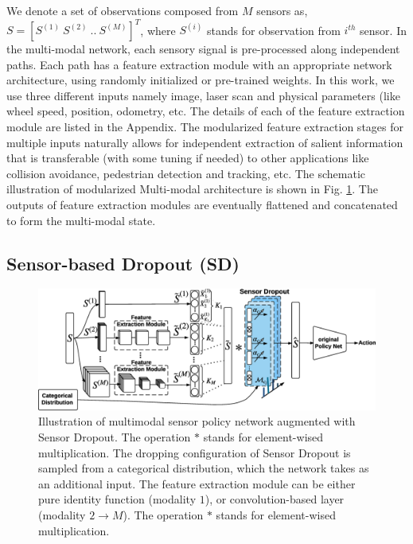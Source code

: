 \documentclass[../thesis.tex]{subfiles}
\begin{document}
We denote a set of observations composed from $M$ sensors as, $S = [S^{(1)}~S^{(2)}~..~S^{(M)}]^T$, where $S^{(i)}$ stands for observation from $i^{th}$ sensor. In the multi-modal network, each sensory signal is pre-processed along independent paths. Each path has a feature extraction module with an appropriate network architecture, using randomly initialized or pre-trained weights. In this work, we use three different inputs namely image, laser scan and physical parameters (like wheel speed, position, odometry, etc. The details of each of the feature extraction module are listed in the Appendix. The modularized feature extraction stages for multiple inputs naturally allows for independent extraction of salient information that is transferable (with some tuning if needed) to other applications like collision avoidance, pedestrian detection and tracking, etc. The schematic illustration of modularized Multi-modal architecture is shown in Fig. \ref{fig:Multi-SD}. The outputs of feature extraction modules are eventually flattened and concatenated to form the multi-modal state. 

\subsection{Sensor-based Dropout (SD)} \label{sec:SD}

\begin{figure}[t]
	\begin{center}
	\centerline{\includegraphics[width=0.8\columnwidth]{./MultimodalDRL/fig/SD_new}} %
	\caption{Illustration of multimodal sensor policy network augmented with Sensor Dropout. The operation $*$ stands for element-wised multiplication. The dropping configuration of Sensor Dropout is sampled from a categorical distribution, which the network takes as an additional input. The feature extraction module can be either pure identity function (modality $1$), or convolution-based layer (modality $2 \to M$). The operation $*$ stands for element-wised multiplication.}
	\label{fig:Multi-SD}
	\end{center}
\end{figure} 
\end{document}

